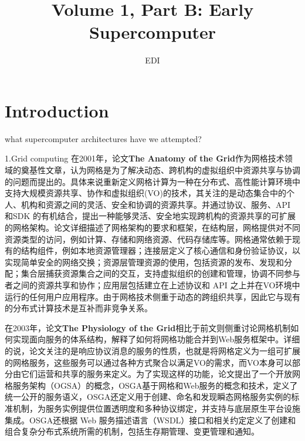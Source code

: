 \documentclass[a4paper,twoside]{scrbook}
\begin{document}
\title{Volume 1, Part B: Early Supercomputer}
\author{EDI}
\frontmatter
\maketitle
\tableofcontents
\mainmatter

\chapter{Introduction}

what supercomputer architectures have we attempted?

1.Grid computing
在2001年，论文\textbf{The Anatomy of the Grid}作为网格技术领域的奠基性文章，认为网格是为了解决动态、跨机构的虚拟组织中资源共享与协调的问题而提出的。具体来说重新定义网格计算为一种在分布式、高性能计算环境中支持大规模资源共享、协作和虚拟组织(VO)的技术，其关注的是动态集合中的个人、机构和资源之间的灵活、安全和协调的资源共享。并通过协议、服务、API 和SDK 的有机结合，提出一种能够灵活、安全地实现跨机构的资源共享的可扩展的网格架构。论文详细描述了网格架构的要求和框架，在结构层，网格提供对不同资源类型的访问，例如计算、存储和网络资源、代码存储库等。网格通常依赖于现有的结构组件，例如本地资源管理器；连接层定义了核心通信和身份验证协议，以实现简单安全的网络交换；资源层管理资源的使用，包括资源的发布、发现和分配；集合层捕获资源集合之间的交互，支持虚拟组织的创建和管理，协调不同参与者之间的资源共享和协作；应用层包括建立在上述协议和 API 之上并在VO环境中运行的任何用户应用程序。由于网格技术侧重于动态的跨组织共享，因此它与现有的分布式计算技术是互补而非竞争关系。

在2003年，论文\textbf{The Physiology of the Grid}相比于前文则侧重讨论网格机制如何实现面向服务的体系结构，解释了如何将网格功能合并到Web服务框架中。详细的说，论文关注的是响应协议消息的服务的性质，也就是将网格定义为一组可扩展的网格服务，这些服务可以通过各种方式聚合以满足VO的需求，而VO本身可以部分由它们运营和共享的服务来定义。为了实现这样的功能，论文提出了一个开放网格服务架构（OGSA）的概念，OSGA基于网格和Web服务的概念和技术，定义了统一公开的服务语义，OSGA还定义用于创建、命名和发现瞬态网格服务实例的标准机制，为服务实例提供位置透明度和多种协议绑定，并支持与底层原生平台设施集成。OSGA还根据 Web 服务描述语言（WSDL）接口和相关约定定义了创建和组合复杂分布式系统所需的机制，包括生存期管理、变更管理和通知。
\end{document}
